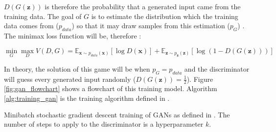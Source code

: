 $D(G(\mathbf{z}))$ is therefore the probability that a generated input came from the training data. The goal of $G$ is to estimate the distribution which the training data comes from ($p_{data}$) so that it may draw samples from this estimation ($p_G$) \cite{Goodfellow2014}. The minimax loss function will be, therefore :

\begin{equation} \label{eq:minimax}
	\min_{G} \max_{D} V(D, G) = \mathbb{E}_{\mathbf{x} \sim p_{data}(\mathbf{x})} [\log D(\mathbf{x})] + \mathbb{E}_{\mathbf{z} \sim p_{\mathbf{z}}(\mathbf{z})} [\log(1 - D(G(\mathbf{z})))]
\end{equation}

In theory, the solution of this game will be when $p_G = p_{data}$ and the discriminator will guess every generated input randomly ($D(G(\mathbf{z})) = \frac{1}{2}$). Figure \ref{fig:gan_flowchart} shows a flowchart of this training model. Algorithm \ref{alg:training_gan} is the training algorithm defined in \cite{Goodfellow2014}.

\begin{algorithm}
	\caption{Minibatch stochastic gradient descent training of GANs as defined in \cite{Goodfellow2014}. The number of steps to apply to the discriminator is a hyperparameter $k$.} \label{alg:training_gan}
\end{algorithm}

